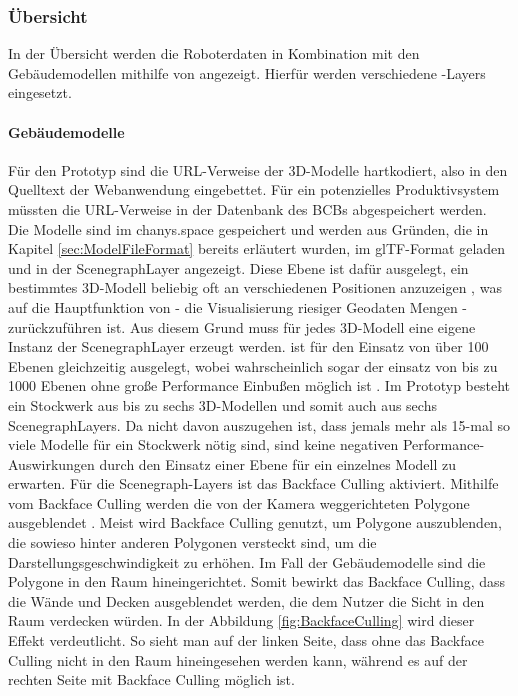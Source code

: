 \subsubsection{Übersicht}
In der Übersicht werden die Roboterdaten in Kombination mit den Gebäudemodellen mithilfe von \deckgl{} angezeigt. Hierfür werden verschiedene \deckgl{}-Layers eingesetzt.

\paragraph{Gebäudemodelle}
Für den Prototyp sind die \ac{URL}-Verweise der 3D-Modelle hartkodiert, also in den Quelltext der Webanwendung eingebettet. Für ein potenzielles Produktivsystem müssten die \ac{URL}-Verweise in der Datenbank des \ac{BCB}s abgespeichert werden. Die Modelle sind im chanys.space gespeichert und werden aus Gründen, die in Kapitel \ref{sec:ModelFileFormat} bereits erläutert wurden, im \ac{glTF}-Format geladen und in der ScenegraphLayer angezeigt. Diese Ebene ist dafür ausgelegt, ein bestimmtes 3D-Modell beliebig oft an verschiedenen Positionen anzuzeigen \cite{DeckglScenegraphLayer}, was auf die Hauptfunktion von \deckgl{} - die Visualisierung riesiger Geodaten Mengen \cite{Deckgl} - zurückzuführen ist. Aus diesem Grund muss für jedes 3D-Modell eine eigene Instanz der ScenegraphLayer erzeugt werden. \deckgl{} ist für den Einsatz von über 100 Ebenen gleichzeitig ausgelegt, wobei wahrscheinlich sogar der einsatz von bis zu 1000 Ebenen ohne große Performance Einbußen möglich ist \cite{DeckglPerformance}. Im Prototyp besteht ein Stockwerk aus bis zu sechs 3D-Modellen und somit auch aus sechs ScenegraphLayers. Da nicht davon auszugehen ist, dass jemals mehr als 15-mal so viele Modelle für ein Stockwerk nötig sind, sind keine negativen Performance-Auswirkungen durch den Einsatz einer Ebene für ein einzelnes Modell zu erwarten.
Für die Scenegraph-Layers ist das Backface Culling aktiviert. Mithilfe vom Backface Culling werden die von der Kamera weggerichteten Polygone ausgeblendet \cite{BackfaceCulling}. Meist wird Backface Culling genutzt, um Polygone auszublenden, die sowieso hinter anderen Polygonen versteckt sind, um die Darstellungsgeschwindigkeit zu erhöhen. Im Fall der Gebäudemodelle sind die Polygone in den Raum hineingerichtet. Somit bewirkt das Backface Culling, dass die Wände und Decken ausgeblendet werden, die dem Nutzer die Sicht in den Raum verdecken würden. In der Abbildung \ref{fig:BackfaceCulling} wird dieser Effekt verdeutlicht. So sieht man auf der linken Seite, dass ohne das Backface Culling nicht in den Raum hineingesehen werden kann, während es auf der rechten Seite mit Backface Culling möglich ist.

